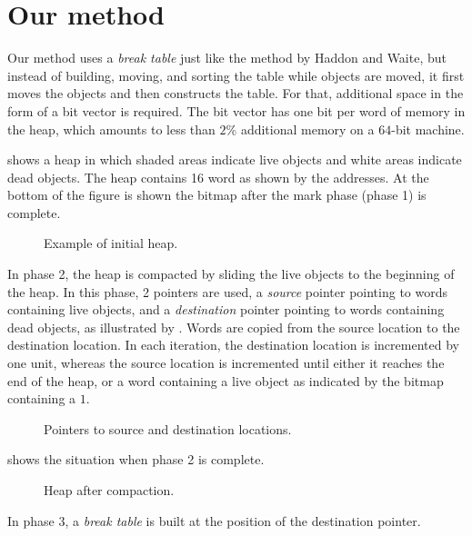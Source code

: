 \section{Our method}

Our method uses a \emph{break table} just like the method by Haddon
and Waite, but instead of building, moving, and sorting the table
while objects are moved, it first moves the objects and then
constructs the table.  For that, additional space in the form of a bit
vector is required.  The bit vector has one bit per word of memory in
the heap, which amounts to less than $2$\% additional memory on a
$64$-bit machine. 

 shows a heap in which shaded areas indicate
live objects and white areas indicate dead objects.  The heap contains
16 word as shown by the addresses.  At the bottom of the figure is
shown the bitmap after the mark phase (phase 1) is complete.

\begin{figure}
\begin{center}
\end{center}
\caption{\label{fig-example-a}
Example of initial heap.}
\end{figure}

In phase 2, the heap is compacted by sliding the live objects to the
beginning of the heap.  In this phase, 2 pointers are used, a
\emph{source} pointer pointing to words containing live objects, and a
\emph{destination} pointer pointing to words containing dead objects,
as illustrated by .  Words are copied from the
source location to the destination location.  In each iteration, the
destination location is incremented by one unit, whereas the source
location is incremented until either it reaches the end of the heap,
or a word containing a live object as indicated by the bitmap
containing a $1$.

\begin{figure}
\begin{center}
\end{center}
\caption{\label{fig-example-b}
Pointers to source and destination locations.}
\end{figure}

 shows the situation when phase 2 is complete. 

\begin{figure}
\begin{center}
\end{center}
\caption{\label{fig-example-c}
Heap after compaction.}
\end{figure}

In phase 3, a \emph{break table} is built at the position of the
destination pointer.
